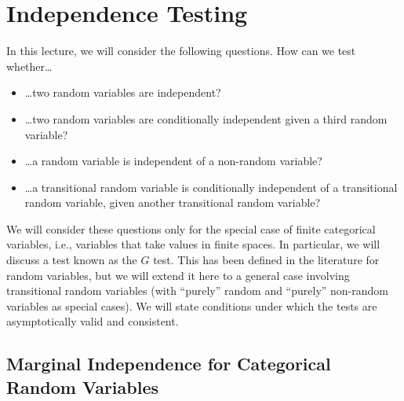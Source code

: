 \section{Independence Testing}


In this lecture, we will consider the following questions. How can we test whether\dots
\begin{itemize}
  \item \dots two random variables are independent?
  \item \dots two random variables are conditionally independent given a third random variable?
  \item \dots a random variable is independent of a non-random variable?
  \item \dots a transitional random variable is conditionally independent of a transitional random variable, given another transitional random variable?
\end{itemize}
We will consider these questions only for the special case of finite categorical variables, i.e., 
variables that take values in finite spaces.  In particular, we will discuss a test known as the $G$ test.
This has been defined in the literature for random variables, but we will extend it here to a general case
involving transitional random variables (with ``purely'' random and ``purely'' non-random variables as special cases).
We will state conditions under which the tests are asymptotically valid and consistent.

\subsection{Marginal Independence for Categorical Random Variables}

